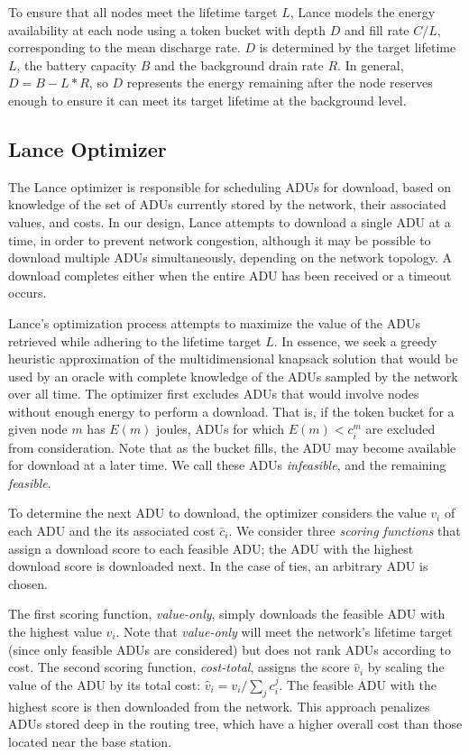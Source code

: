 To ensure that all nodes meet the lifetime target $L$, Lance models the
energy availability at each node using a token bucket with depth $D$ and fill
rate $C/L$, corresponding to the mean discharge rate.  $D$ is determined by
the target lifetime $L$, the battery capacity $B$ and the background drain
rate $R$.  In general, $D = B - L*R$, so $D$ represents the energy remaining
after the node reserves enough to ensure it can meet its target lifetime at
the background level.

\subsection{Lance Optimizer}
\label{subsec-lanceoptimizer}

The Lance optimizer is responsible for scheduling ADUs for download, based on
knowledge of the set of ADUs currently stored by the network, their
associated values, and costs.  In our design, Lance attempts to download a
single ADU at a time, in order to prevent network congestion, although it may
be possible to download multiple ADUs simultaneously, depending on the
network topology. A download completes either when the entire ADU has been
received or a timeout occurs.

Lance's optimization process attempts to maximize the value of the ADUs
retrieved while adhering to the lifetime target $L$. In essence, we seek a
greedy heuristic approximation of the multidimensional knapsack solution that
would be used by an oracle with complete knowledge of the ADUs sampled by the
network over all time.  The optimizer first excludes ADUs that would involve
nodes without enough energy to perform a download.  That is, if the token
bucket for a given node $m$ has $E(m)$ joules, ADUs for which $E(m) < c_i^m$
are excluded from consideration.  Note that as the bucket fills, the ADU may
become available for download at a later time. We call these ADUs {\em
infeasible}, and the remaining {\em feasible}.

To determine the next ADU to download, the optimizer considers the 
value $v_i$ of each ADU and the its associated cost $\bar{c}_i$.
We consider three {\em scoring functions} that assign a 
download score to each feasible ADU; the ADU with the highest download score
is downloaded next. In the case of ties, an arbitrary ADU is chosen.

The first scoring function, {\em value-only}, simply downloads the feasible
ADU with the highest value $v_i$. Note that {\em value-only} will meet the
network's lifetime target (since only feasible ADUs are considered) but does
not rank ADUs according to cost.  The second scoring function, {\em
cost-total}, assigns the score $\hat{v}_i$ by scaling the value of the ADU by
its total cost: $\hat{v}_i = v_i / \sum_j c_i^j$. The feasible ADU with the
highest score is then downloaded from the network. This approach penalizes
ADUs stored deep in the routing tree, which have a higher overall cost than
those located near the base station. 

